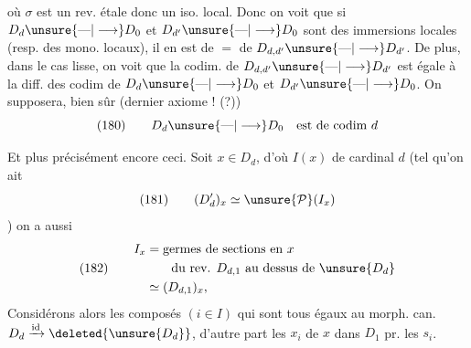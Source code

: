 où $\sigma$ est un rev. étale donc un iso. local. Donc on voit que si $D_d\unsure{\text{---}|\longrightarrow}D_0$ et $D_{d'}\unsure{\text{---}|\longrightarrow}D_0$ sont des immersions locales (resp. des mono. locaux), il en est de $=$ de $D_{d,d'}\unsure{\text{---}|\longrightarrow}D_{d'}$. De plus, dans le cas lisse, on voit que la codim. de $D_{d,d'}\unsure{\text{---}|\longrightarrow}D_{d'}$ est égale à la diff. des codim de $D_d\unsure{\text{---}|\longrightarrow}D_0$ et $D_{d'}\unsure{\text{---}|\longrightarrow}D_0$. On supposera, bien sûr (dernier axiome ! (?))
\[
(180)\qquad D_d\unsure{\text{---}|\longrightarrow}D_0\quad\text{est de codim }d
\]

 Et plus précisément encore ceci. Soit  $x\in D_d$, d'où $I(x)$ de cardinal $d$ (tel qu'on ait
\[
(181)\qquad(D'_d)_x\simeq\unsure{\mathcal P}(I_x)
\]
)
  on a aussi
\[
(182)\qquad\begin{aligned}
I_x&=\text{germes de sections en }x\\
&\qquad\text{du rev. }D_{d,1}\text{ au dessus de }\unsure{D_d}\\
&\simeq(D_{d,1})_x,
\end{aligned}
\]
Considérons alors les composés $(i\in I)$
qui sont tous égaux au morph. can. $D_d\xrightarrow{\mathrm{id}}\deleted{\unsure{D_d}}$, d'autre part les  $x_i$ de $x$ dans $D_1$ pr. les $s_i$.
